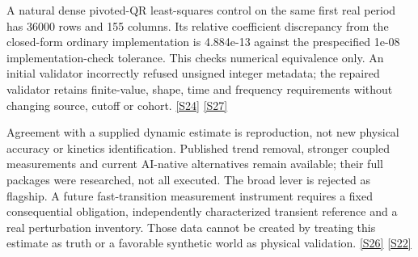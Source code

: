 \documentclass[11pt,letterpaper]{article}
\begin{document}
A natural dense pivoted-QR least-squares control on the same first real period has 36000 rows and 155 columns. Its relative coefficient discrepancy from the closed-form ordinary implementation is 4.884e-13 against the prespecified 1e-08 implementation-check tolerance. This checks numerical equivalence only. An initial validator incorrectly refused unsigned integer metadata; the repaired validator retains finite-value, shape, time and frequency requirements without changing source, cutoff or cohort. \href{https://github.com/MontrealAI/AGI-Alpha-Invention-Flywheel-Lab/blob/2b7a58e6e6593ae48da6f7f33865db94868c957f/research/eis008/development/JOINT_BASELINE_QUALIFICATION.json}{[S24]} \href{https://github.com/MontrealAI/AGI-Alpha-Invention-Flywheel-Lab/blob/2b7a58e6e6593ae48da6f7f33865db94868c957f/research/eis008/development/run-r1/FAILURE.json}{[S27]}\par
Agreement with a supplied dynamic estimate is reproduction, not new physical accuracy or kinetics identification. Published trend removal, stronger coupled measurements and current AI-native alternatives remain available; their full packages were researched, not all executed. The broad lever is rejected as flagship. A future fast-transition measurement instrument requires a fixed consequential obligation, independently characterized transient reference and a real perturbation inventory. Those data cannot be created by treating this estimate as truth or a favorable synthetic world as physical validation. \href{https://github.com/MontrealAI/AGI-Alpha-Invention-Flywheel-Lab/blob/2b7a58e6e6593ae48da6f7f33865db94868c957f/research/eis008/development/SOURCES.json}{[S26]} \href{https://github.com/MontrealAI/AGI-Alpha-Invention-Flywheel-Lab/blob/2b7a58e6e6593ae48da6f7f33865db94868c957f/research/eis008/development/PROTOCOL.json}{[S22]}\par
\end{document}
